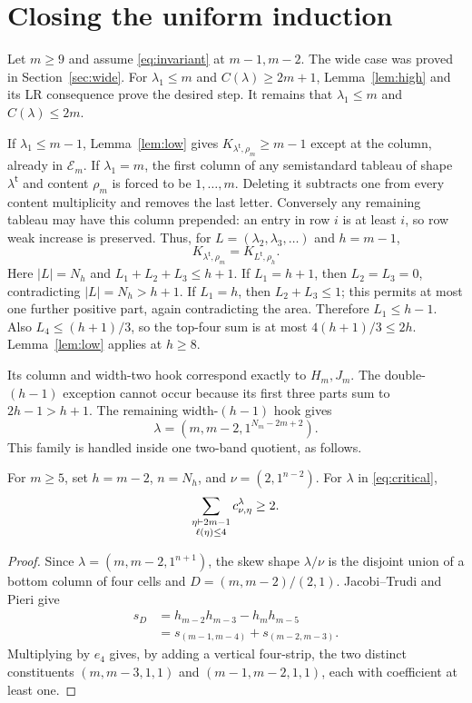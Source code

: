 \documentclass[11pt]{article}
\theoremstyle{remark}\newtheorem{remark}[theorem]{Remark}
\newcommand{\trp}{\mathsf t}\newcommand{\eps}{\varepsilon}
\numberwithin{equation}{section}\setlength{\emergencystretch}{2em}
\begin{document}
\section{Closing the uniform induction}\label{sec:assembly}
Let $m\ge9$ and assume \eqref{eq:invariant} at $m-1,m-2$.
The wide case was proved in Section~\ref{sec:wide}. For
$\lambda_1\le m$ and $C(\lambda)\ge2m+1$,
Lemma~\ref{lem:high} and its LR consequence prove the desired step.
It remains that $\lambda_1\le m$ and $C(\lambda)\le2m$.

If $\lambda_1\le m-1$, Lemma~\ref{lem:low} gives
$K_{\lambda^{\trp},\rho_m}\ge m-1$ except at the column, already in
$\mathcal E_m$. If $\lambda_1=m$, the first column of any semistandard
tableau of shape $\lambda^{\trp}$ and content $\rho_m$ is forced to
be $1,\ldots,m$. Deleting it subtracts one from every content
multiplicity and removes the last letter. Conversely any remaining
tableau may have this column prepended: an entry in row $i$ is at
least $i$, so row weak increase is preserved. Thus, for
$L=(\lambda_2,\lambda_3,\ldots)$ and $h=m-1$,
\begin{equation}\label{eq:deletecolumn}
 K_{\lambda^{\trp},\rho_m}=K_{L^{\trp},\rho_h}.
\end{equation}
Here $|L|=N_h$ and $L_1+L_2+L_3\le h+1$.
If $L_1=h+1$, then $L_2=L_3=0$, contradicting $|L|=N_h>h+1$.
If $L_1=h$, then $L_2+L_3\le1$; this permits at most one further
positive part, again contradicting the area. Therefore $L_1\le h-1$.
Also $L_4\le(h+1)/3$, so the top-four sum is at most
$4(h+1)/3\le2h$. Lemma~\ref{lem:low} applies at $h\ge8$.

Its column and width-two hook correspond exactly to $H_m,J_m$.
The double-$(h-1)$ exception cannot occur because its first three parts
sum to $2h-1>h+1$. The remaining width-$(h-1)$ hook gives
\begin{equation}\label{eq:critical}
 \lambda=(m,m-2,1^{N_m-2m+2}).
\end{equation}
This family is handled inside one two-band quotient, as follows.

\begin{lemma}\label{lem:critical}
For $m\ge5$, set $h=m-2$, $n=N_h$, and
$\nu=(2,1^{n-2})$. For $\lambda$ in \eqref{eq:critical},
\[
 \sum_{\substack{\eta\vdash2m-1\\\ell(\eta)\le4}}
 c_{\nu,\eta}^{\lambda}\ge2.
\]
\end{lemma}
\begin{proof}
Since $\lambda=(m,m-2,1^{n+1})$, the skew shape $\lambda/\nu$
is the disjoint union of a bottom column of four cells and
$D=(m,m-2)/(2,1)$. Jacobi--Trudi and Pieri give
\begin{align*}
 s_D&=h_{m-2}h_{m-3}-h_mh_{m-5}\\
    &=s_{(m-1,m-4)}+s_{(m-2,m-3)}.
\end{align*}
Multiplying by $e_4$ gives, by adding a vertical four-strip, the two
distinct constituents $(m,m-3,1,1)$ and $(m-1,m-2,1,1)$,
each with coefficient at least one.
\end{proof}
\end{document}
